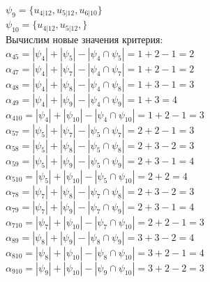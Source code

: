 \documentclass[12pt,a4paper]{report}
\begin{document}
$\psi_{9} = \{u_{4 | 12},u_{5 | 12},u_{6 | 10}\}$ \\
$\psi_{10} = \{u_{4 | 12},u_{5 | 12},\}$ \\
Вычислим новые значения критерия:\\
$\alpha_{45} = |\psi_{4}| + |\psi_{5}| - |\psi_{4} \cap \psi_{5}| = 1+2-1=2$\\
$\alpha_{47} = |\psi_{4}| + |\psi_{7}| - |\psi_{4} \cap \psi_{7}| = 1+2-1=2$\\
$\alpha_{48} = |\psi_{4}| + |\psi_{8}| - |\psi_{4} \cap \psi_{8}| = 1+3-1=3$\\
$\alpha_{49} = |\psi_{4}| + |\psi_{9}| - |\psi_{4} \cap \psi_{9}| = 1+3=4$\\
$\alpha_{410} = |\psi_{4}| + |\psi_{10}| - |\psi_{4} \cap \psi_{10}| = 1+2-1=3$\\
$\alpha_{57} = |\psi_{5}| + |\psi_{7}| - |\psi_{5} \cap \psi_{7}| = 2+2-1=3$\\
$\alpha_{58} = |\psi_{5}| + |\psi_{8}| - |\psi_{5} \cap \psi_{8}| = 2+3-2=3$\\
$\alpha_{59} = |\psi_{5}| + |\psi_{9}| - |\psi_{5} \cap \psi_{9}| = 2+3-1=4$\\
$\alpha_{510} = |\psi_{5}| + |\psi_{10}| - |\psi_{5} \cap \psi_{10}| = 2+2=4$\\
$\alpha_{78} = |\psi_{7}| + |\psi_{8}| - |\psi_{7} \cap \psi_{8}| = 2+3-2=3$\\
$\alpha_{79} = |\psi_{7}| + |\psi_{9}| - |\psi_{7} \cap \psi_{9}| = 2+3-1=4$\\
$\alpha_{710} = |\psi_{7}| + |\psi_{10}| - |\psi_{7} \cap \psi_{10}| = 2+2-1=3$\\
$\alpha_{89} = |\psi_{8}| + |\psi_{9}| - |\psi_{8} \cap \psi_{9}| = 3+3-2=4$\\
$\alpha_{810} = |\psi_{8}| + |\psi_{10}| - |\psi_{8} \cap \psi_{10}| = 3+2-1=4$\\
$\alpha_{910} = |\psi_{9}| + |\psi_{10}| - |\psi_{9} \cap \psi_{10}| = 3+2-2=3$\\
\end{document}
